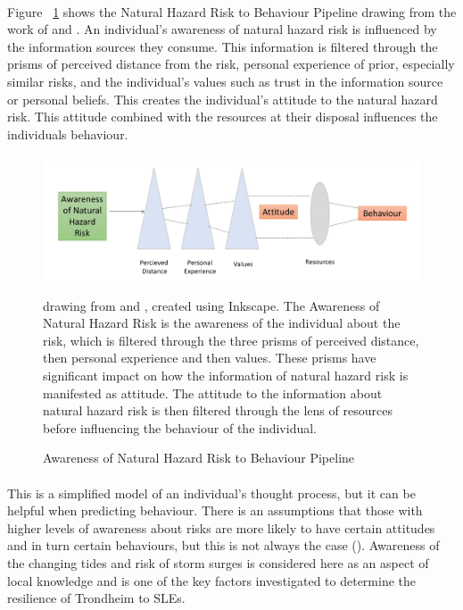 \paragraph{}
Figure ~\ref{fig:hazard_to_behaviour} shows the Natural Hazard Risk to Behaviour Pipeline drawing from the work of \cite{whitmarsh_are_2008} and \cite{lujala_climate_2015}. 
An individual's awareness of natural hazard risk is influenced by the information sources they consume. This information is filtered through the prisms of perceived distance from the risk, personal experience of prior, especially similar risks, and the individual's values such as trust in the information source or personal beliefs. This creates the individual's attitude to the natural hazard risk. This attitude combined with the resources at their disposal influences the individuals behaviour.

\paragraph{}


\begin{figure}[h]
    \centering
    \includegraphics[width=1\textwidth]{fig_theory/new_awareness_ lujala_whitmarsh.png}
     \caption{Awareness of Natural Hazard Risk to Behaviour Pipeline}{ drawing from \cite{lujala_climate_2015} and \cite{whitmarsh_are_2008}, created using Inkscape.  The Awareness of Natural Hazard Risk is the awareness of the individual about the risk, which is filtered through the three prisms of perceived distance, then personal experience and then values. These prisms have significant impact on how the information of natural hazard risk is manifested as attitude. The attitude to the information about natural hazard risk is then filtered through the lens of resources before influencing the behaviour of the individual.} 
    \label{fig:hazard_to_behaviour}
\end{figure} 
\paragraph{}
This is a simplified model of an individual's thought process, but it can be helpful when predicting behaviour. There is an assumptions that those with higher levels of awareness about risks are more likely to have certain attitudes and in turn certain behaviours, but this is not always the case (\cite{lujala_climate_2015}).  Awareness of the changing tides and risk of storm surges is considered here as an aspect of local knowledge and is one of the key factors investigated to determine the resilience of Trondheim to SLEs. 

